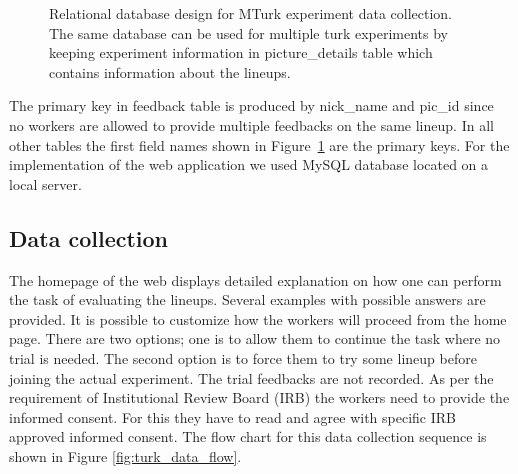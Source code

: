 \documentclass[11pt]{article}
\begin{document}
\begin{figure}[hbtp]
   \centering
       \caption{Relational database design for MTurk experiment data collection. The same database can be used for multiple turk experiments by keeping experiment information in picture\_details table which contains information about the lineups.}
       \label{fig:turk_database_design}
\end{figure}

The primary key in feedback table is produced by nick\_name and pic\_id since no workers are allowed to provide multiple feedbacks on the same lineup. In all other tables the first field names shown in Figure~\ref{fig:turk_database_design} are the primary keys. For the implementation of the web application we used MySQL database located on a local server.

\subsection{Data collection} 

The homepage of the web displays detailed explanation on how one can perform the task of evaluating the lineups. Several examples with possible answers are provided. It is possible to customize how the workers will proceed from the home page. There are two options; one is to allow them to continue the task where no trial is needed. The second option is to force them to try some lineup before joining the actual experiment. The trial feedbacks are not recorded. As per the requirement of Institutional Review Board (IRB) the workers need to provide the informed consent. For this they have to read and agree with specific IRB approved informed consent. The flow chart for this data collection sequence is shown in Figure \ref{fig:turk_data_flow}.
\end{document}

